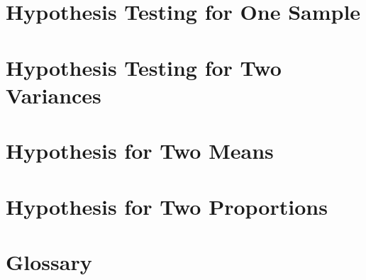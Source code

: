 \section{Hypothesis Testing for One Sample}
\section{Hypothesis Testing for Two Variances}
\section{Hypothesis for Two Means}
\section{Hypothesis for Two Proportions}
\section*{Glossary} 


